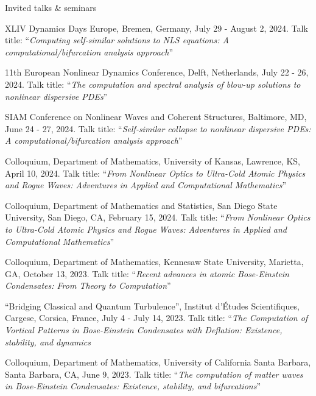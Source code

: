 \documentclass[10pt]{article} %
\begin{document}
\begin{section}{Invited talks \& seminars}
\begin{etaremune}
\item XLIV Dynamics Days Europe, Bremen, Germany, July 29 - August 2, 2024.
Talk title: ``\textit{Computing self-similar solutions to NLS equations: A computational/bifurcation analysis approach}''

\item 11th European Nonlinear Dynamics Conference, Delft, Netherlands, July 22 - 26, 2024.
Talk title: ``\textit{The computation and spectral analysis of blow-up solutions to nonlinear dispersive PDEs}''

\item SIAM Conference on Nonlinear Waves and Coherent Structures, Baltimore, MD, June 24 - 27, 2024.
Talk title: ``\textit{Self-similar collapse to nonlinear dispersive PDEs: A computational/bifurcation analysis approach}''

\item Colloquium, Department of Mathematics, University of Kansas, Lawrence, KS, April 10, 2024.
Talk title: ``\textit{From Nonlinear Optics to Ultra-Cold Atomic Physics and Rogue Waves:
Adventures in Applied and Computational Mathematics}''

\item Colloquium, Department of Mathematics and Statistics, San Diego State University, San Diego, CA, February 15, 2024.
Talk title: ``\textit{From Nonlinear Optics to Ultra-Cold Atomic Physics and Rogue Waves:
Adventures in Applied and Computational Mathematics}''

\item  Colloquium, Department of Mathematics, Kennesaw State University, Marietta, GA, October 13, 2023.
Talk title: ``\textit{Recent advances in atomic Bose-Einstein Condensates: From Theory to Computation}''

\item ``Bridging Classical and Quantum Turbulence'',
Institut d'\'Etudes Scientifiques, Cargese, Corsica, France, July 4 - July 14, 2023.
Talk title: ``\textit{The Computation of Vortical Patterns in Bose-Einstein Condensates with
Deflation: Existence, stability, and dynamics}

\item Colloquium, Department of Mathematics, University of California Santa Barbara, Santa Barbara, CA, June 9, 2023.
Talk title: ``\textit{The computation of matter waves in Bose-Einstein Condensates: Existence, stability, and bifurcations}''



\end{etaremune}
\end{section}
\end{document}
